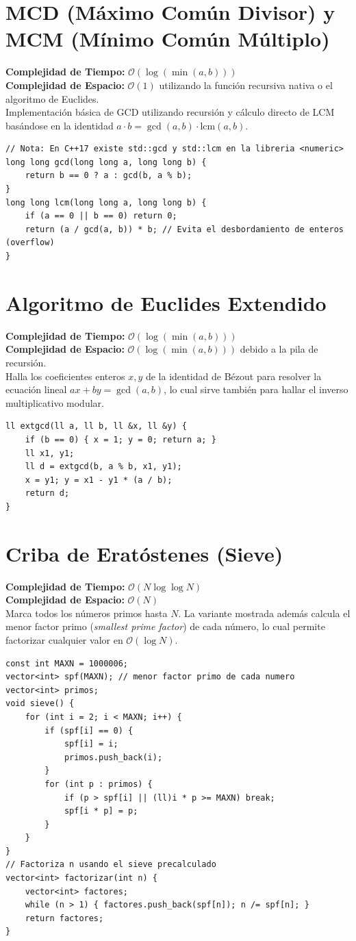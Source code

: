 \documentclass[10pt,twocolumn,letterpaper]{report}
\begin{document}
\section{MCD (Máximo Común Divisor) y MCM (Mínimo Común Múltiplo)}
\textbf{Complejidad de Tiempo:} $\mathcal{O}(\log(\min(a, b)))$ \\
\textbf{Complejidad de Espacio:} $\mathcal{O}(1)$ utilizando la función recursiva nativa o el algoritmo de Euclides. \\
Implementación básica de GCD utilizando recursión y cálculo directo de LCM basándose en la identidad $a \cdot b = \gcd(a, b) \cdot \text{lcm}(a, b)$.
\begin{lstlisting}
// Nota: En C++17 existe std::gcd y std::lcm en la libreria <numeric>
long long gcd(long long a, long long b) {
    return b == 0 ? a : gcd(b, a % b);
}
long long lcm(long long a, long long b) {
    if (a == 0 || b == 0) return 0;
    return (a / gcd(a, b)) * b; // Evita el desbordamiento de enteros (overflow)
}
\end{lstlisting}
\section{Algoritmo de Euclides Extendido}
\textbf{Complejidad de Tiempo:} $\mathcal{O}(\log(\min(a, b)))$ \\
\textbf{Complejidad de Espacio:} $\mathcal{O}(\log(\min(a, b)))$ debido a la pila de recursión. \\
Halla los coeficientes enteros $x, y$ de la identidad de Bézout para resolver la ecuación lineal $ax + by = \gcd(a, b)$, lo cual sirve también para hallar el inverso multiplicativo modular.
\begin{lstlisting}
ll extgcd(ll a, ll b, ll &x, ll &y) {
    if (b == 0) { x = 1; y = 0; return a; }
    ll x1, y1;
    ll d = extgcd(b, a % b, x1, y1);
    x = y1; y = x1 - y1 * (a / b);
    return d;
}
\end{lstlisting}
\section{Criba de Eratóstenes (Sieve)}
\textbf{Complejidad de Tiempo:} $\mathcal{O}(N \log \log N)$ \\
\textbf{Complejidad de Espacio:} $\mathcal{O}(N)$ \\
Marca todos los números primos hasta $N$. La variante mostrada además calcula el menor factor primo (\textit{smallest prime factor}) de cada número, lo cual permite factorizar cualquier valor en $\mathcal{O}(\log N)$.
\begin{lstlisting}
const int MAXN = 1000006;
vector<int> spf(MAXN); // menor factor primo de cada numero
vector<int> primos;
void sieve() {
    for (int i = 2; i < MAXN; i++) {
        if (spf[i] == 0) {
            spf[i] = i;
            primos.push_back(i);
        }
        for (int p : primos) {
            if (p > spf[i] || (ll)i * p >= MAXN) break;
            spf[i * p] = p;
        }
    }
}
// Factoriza n usando el sieve precalculado
vector<int> factorizar(int n) {
    vector<int> factores;
    while (n > 1) { factores.push_back(spf[n]); n /= spf[n]; }
    return factores;
}
\end{lstlisting}
\end{document}
